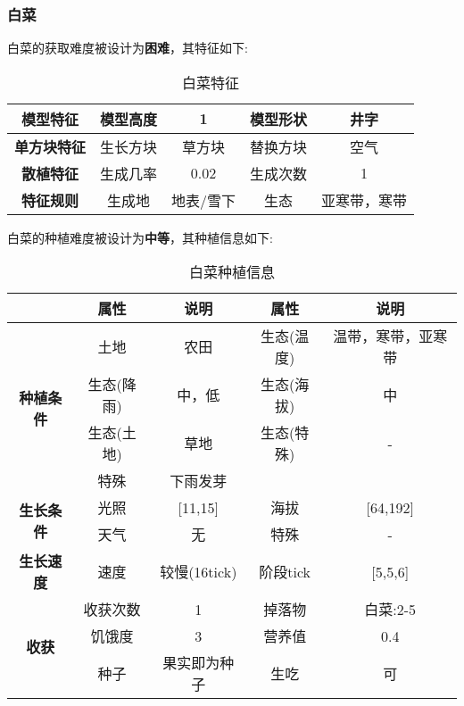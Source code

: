 \subsubsection{白菜}

白菜的获取难度被设计为\textbf{困难}，其特征如下:
\begin{table}[H]
    \centering
    \caption{白菜特征}
    \label{table:白菜特征}
    \setlength{\tabcolsep}{4mm}
    \begin{tabular}{c|cc|cc}
        \toprule
        \textbf{模型特征}   & 模型高度 & 1      & 模型形状 & 井字     \\
        \midrule
        \textbf{单方块特征} & 生长方块 & 草方块 & 替换方块 & 空气     \\
        \midrule
        \textbf{散植特征}   & 生成几率 & 0.02   & 生成次数 & 1        \\
        \midrule
        \textbf{特征规则}   & 生成地   & 地表/雪下   & 生态     & 亚寒带，寒带 \\
        \bottomrule
    \end{tabular}
\end{table}


白菜的种植难度被设计为\textbf{中等}，其种植信息如下:

\begin{table}[H]
    \centering
    \caption{白菜种植信息}
    \label{table:白菜种植信息}
    \setlength{\tabcolsep}{4mm}
    \begin{tabular}{c|cc|cc}
        \toprule
                                           & \textbf{属性} & \textbf{说明} & \textbf{属性} & \textbf{说明} \\
        \midrule
        \multirow{4}{*}{\textbf{种植条件}} & 土地          & 农田          & 生态(温度)    & 温带，寒带，亚寒带    \\
                                           & 生态(降雨)    & 中，低        & 生态(海拔)    & 中            \\
                                           & 生态(土地)    & 草地          & 生态(特殊)    & -             \\
                                           & 特殊          & 下雨发芽         \\
        \midrule
        \multirow{2}{*}{\textbf{生长条件}} & 光照          & [11,15]        & 海拔          & [64,192]      \\
                                           & 天气          & 无            & 特殊          & -             \\
        \midrule
        \textbf{生长速度}                  & 速度          & 较慢(16tick)     & 阶段tick      & [5,5,6]       \\
        \midrule
        \multirow{3}{*}{\textbf{收获}}     & 收获次数      & 1             & 掉落物        & 白菜:2-5      \\
                                           & 饥饿度        & 3             & 营养值        & 0.4           \\
                                           & 种子          & 果实即为种子  & 生吃          & 可 \\
        \bottomrule
    \end{tabular}
\end{table}


